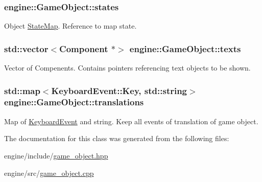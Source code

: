 \subsubsection[{\texorpdfstring{states}{states}}]{ engine\+::\+Game\+Object\+::states}\hypertarget{classengine_1_1_game_object_a109beba63a929e3be8c4c958591cd1a9}{}\label{classengine_1_1_game_object_a109beba63a929e3be8c4c958591cd1a9}
Object \hyperlink{classengine_1_1_state_map}{State\+Map}. Reference to map state. 
\subsubsection[{\texorpdfstring{texts}{texts}}]{\setlength{\rightskip}{0pt plus 5cm}std\+::vector$<${\bf Component} $\ast$$>$ engine\+::\+Game\+Object\+::texts}\hypertarget{classengine_1_1_game_object_aaff0b5ab01495a8f4cb806eb39300534}{}\label{classengine_1_1_game_object_aaff0b5ab01495a8f4cb806eb39300534}
Vector of Compenents. Contains pointers referencing text objects to be shown. 
\subsubsection[{\texorpdfstring{translations}{translations}}]{\setlength{\rightskip}{0pt plus 5cm}std\+::map$<$Keyboard\+Event\+::\+Key, std\+::string$>$ engine\+::\+Game\+Object\+::translations}\hypertarget{classengine_1_1_game_object_a6ac31651c772a941b08c4ce6f89c3bbc}{}\label{classengine_1_1_game_object_a6ac31651c772a941b08c4ce6f89c3bbc}
Map of \hyperlink{classengine_1_1_keyboard_event}{Keyboard\+Event} and string. Keep all events of translation of game object. 

The documentation for this class was generated from the following files\+:\begin{DoxyCompactItemize}
\item 
engine/include/\hyperlink{game__object_8hpp}{game\+\_\+object.\+hpp}\item 
engine/src/\hyperlink{game__object_8cpp}{game\+\_\+object.\+cpp}\end{DoxyCompactItemize}
